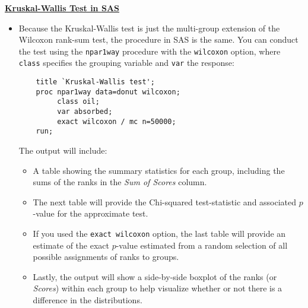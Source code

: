 \documentclass[11pt]{article}
\begin{document}
\textbf{\underline{Kruskal-Wallis Test in SAS}}

\begin{itemize}
	\item Because the Kruskal-Wallis test is just the multi-group extension of the Wilcoxon rank-sum test, the procedure in SAS is the same.  You can conduct the test using the \texttt{npar1way} procedure with the \texttt{wilcoxon} option, where \texttt{class} specifies the grouping variable and \texttt{var} the response:
	\begin{verbatim}
	title `Kruskal-Wallis test';
	proc npar1way data=donut wilcoxon;
	     class oil;
	     var absorbed;
	     exact wilcoxon / mc n=50000;
	run;
	\end{verbatim}
	The output will include:
	\begin{itemize}
	\item A table showing the summary statistics for each group, including the sums of the ranks in the \textit{Sum of Scores} column. 
	\item The next table will provide the Chi-squared test-statistic and associated $p$-value for the approximate test.  
	\item If you used the \texttt{exact wilcoxon} option, the last table will provide an estimate of the exact $p$-value estimated from a random selection of all possible assignments of ranks to groups. 
	\item Lastly, the output will show a side-by-side boxplot of the ranks (or \textit{Scores}) within each group to help visualize whether or not there is a difference in the distributions.
	\end{itemize}
\end{itemize}
\newpage
\end{document}

